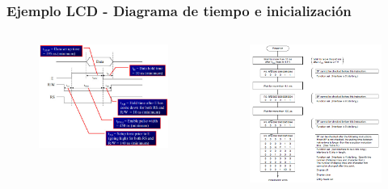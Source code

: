 \documentclass[10.5pt,scale=1.0,t,aspectratio=169,hyperref={pdfpagelabels=false}]{beamer}
\begin{document}
\begin{frame}
	\frametitle{Ejemplo LCD - Diagrama de tiempo e inicialización}
	\begin{columns}
		\begin{figure}
			\centering
			\includegraphics[scale=0.4]{19_TimingDiagramLCD}
		\end{figure}
		
		\begin{figure}
			\centering
			\includegraphics[scale=0.45]{20_Init4Bit}
		\end{figure}
	\end{columns}
\end{frame}
\end{document}

